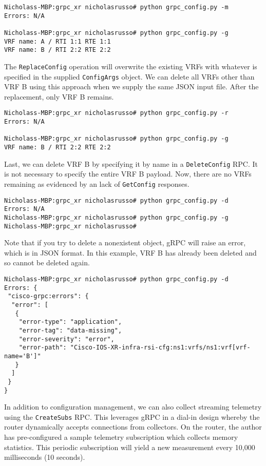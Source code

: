 \begin{verbatim}
Nicholass-MBP:grpc_xr nicholasrusso# python grpc_config.py -m
Errors: N/A

Nicholass-MBP:grpc_xr nicholasrusso# python grpc_config.py -g
VRF name: A / RTI 1:1 RTE 1:1
VRF name: B / RTI 2:2 RTE 2:2
\end{verbatim}

The \verb|ReplaceConfig| operation will overwrite the existing VRFs with
whatever is specified in the supplied \verb|ConfigArgs| object. We can
delete all VRFs other than VRF B using this approach when we supply the
same JSON input file. After the replacement, only VRF B remains.

\begin{verbatim}
Nicholass-MBP:grpc_xr nicholasrusso# python grpc_config.py -r
Errors: N/A

Nicholass-MBP:grpc_xr nicholasrusso# python grpc_config.py -g
VRF name: B / RTI 2:2 RTE 2:2
\end{verbatim}

Last, we can delete VRF B by specifying it by name in a \verb|DeleteConfig|
RPC\@. It is not necessary to specify the entire VRF B payload. Now, there
are no VRFs remaining as evidenced by an lack of \verb|GetConfig| responses.

\begin{verbatim}
Nicholass-MBP:grpc_xr nicholasrusso# python grpc_config.py -d
Errors: N/A
Nicholass-MBP:grpc_xr nicholasrusso# python grpc_config.py -g
Nicholass-MBP:grpc_xr nicholasrusso#
\end{verbatim}

Note that if you try to delete a nonexistent object, gRPC will raise an
error, which is in JSON format. In this example, VRF B has already
been deleted and so cannot be deleted again.

\begin{verbatim}
Nicholass-MBP:grpc_xr nicholasrusso# python grpc_config.py -d
Errors: {
 "cisco-grpc:errors": {
  "error": [
   {
    "error-type": "application",
    "error-tag": "data-missing",
    "error-severity": "error",
    "error-path": "Cisco-IOS-XR-infra-rsi-cfg:ns1:vrfs/ns1:vrf[vrf-name='B']"
   }
  ]
 }
}
\end{verbatim}

In addition to configuration management, we can also collect streaming
telemetry using the \verb|CreateSubs| RPC\@. This leverages gRPC in a dial-in
design whereby the router dynamically accepts connections from collectors.
On the router, the author has pre-configured a sample telemetry subscription
which collects memory statistics. This periodic subscription will yield a new
measurement every 10,000 milliseconds (10 seconds).

